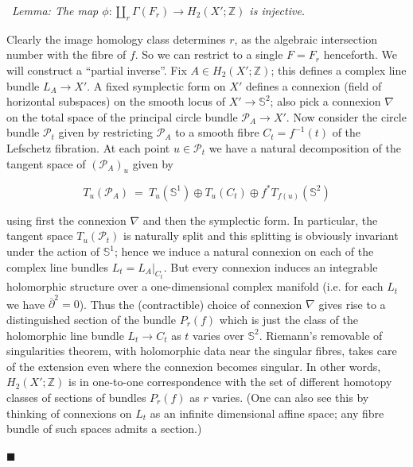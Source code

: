 \documentclass[10pt]{article}
\newcommand{\zz}{\mathbb{Z}}
\newcommand{\sss}{\mathbb{S}}
\newcommand{\cdbar}{\overline{\partial}}
\newcounter{Universal}[section]
\renewcommand{\theUniversal}{\thesection.\arabic{Universal}}
\newenvironment{Italic}{\refstepcounter{Universal} \par \vspace{0.5cm}
\noindent {\bf (\theUniversal)}\ \it}{\par \vspace{0.5cm}}
\newenvironment{Lem}{\begin{Italic}{\sc Lemma: }}{\end{Italic}}
\newenvironment{Pf}{\par \noindent{\sc Proof:} }{\quad $\blacksquare$ \par
\vspace{0.5cm}}
\begin{document}
\begin{Lem} \label{Cyclesinject}
The map $\phi: \amalg_r \Gamma(F_r) \rightarrow H_2 (X';\zz)$ is
injective. 
\end{Lem}

\begin{Pf}
Clearly the image homology class determines $r$, as the algebraic
intersection number with the fibre of $f$.  So we can restrict to a
single $F=F_r$ henceforth.
We will construct a ``partial inverse''.  Fix $A \in H_2 (X'; \zz)$;
this defines a complex line bundle $L_A \rightarrow X'$.  A fixed
symplectic form on $X'$ defines a connexion (field of horizontal
subspaces) on the smooth locus of $X' \rightarrow \sss^2$; also pick a
connexion $\nabla$ on the total space of the principal circle bundle
$\mathcal{P}_A \rightarrow X'$.  Now consider the circle bundle
$\mathcal{P}_t$ given by restricting $\mathcal{P}_A$ to a smooth fibre
$C_t = f^{-1}(t)$ of the Lefschetz fibration.  At each point $u \in
\mathcal{P}_t$ we have a natural decomposition of the tangent space of
$(\mathcal{P}_A)_u$ given by 

$$T_u (\mathcal{P}_A) \ = \ T_u (\sss^1) \oplus T_u (C_t) \oplus f^*
T_{f(u)} (\sss^2)$$

\noindent using first the connexion $\nabla$ and then the symplectic
form.  In particular, the tangent space $T_u (\mathcal{P}_t)$ is
naturally split and this splitting is obviously invariant under the
action of $\sss^1$; hence we induce a natural connexion on each of the
complex line bundles $L_t = L_A |_{C_t}$.  But every connexion induces an
integrable holomorphic structure over a one-dimensional complex
manifold (i.e. for each $L_t$ we have $\cdbar^2 = 0$).  Thus the
(contractible) choice of connexion $\nabla$ gives rise to a
distinguished section of the bundle $P_r(f)$ which is just the class
of the holomorphic line bundle $L_t \rightarrow C_t$ as $t$ varies
over $\sss^2$.  Riemann's removable of singularities theorem, with
holomorphic data near the singular fibres, takes care of the extension
even where the connexion becomes singular.  In other words, $H_2 (X';
\zz)$ is in one-to-one
correspondence with the set of different homotopy classes of sections
of bundles $P_r (f)$ as $r$ varies.  (One can also see this by thinking
of connexions on $L_t$ as an infinite dimensional affine space;
any fibre bundle of such spaces admits a section.)

\vspace{0.2cm}


\end{Pf}
\end{document}
